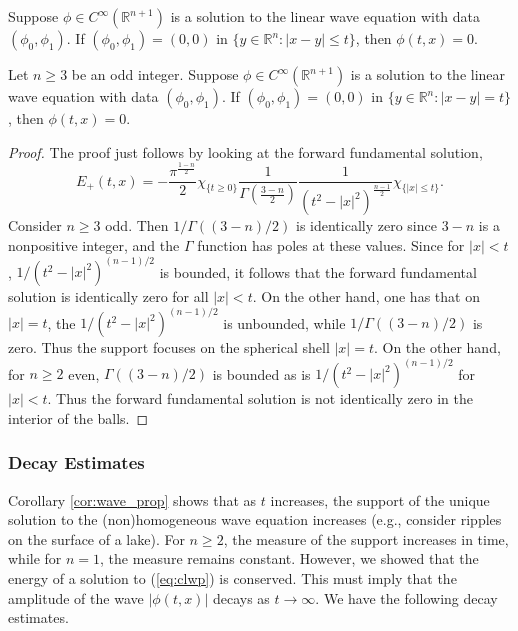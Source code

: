 \documentclass{article}
\begin{document}
\begin{corollary}
	Suppose $\phi  \in C^{\infty}(\mathbb{R}^{n + 1})$ is a solution to the linear wave equation with data $(\phi_{0}, \phi_{1})$. If $(\phi_{0}, \phi_{1}) = (0,0)$ in $\{y \in \mathbb{R}^{n}: |x - y| \leq t\}$, then $\phi(t, x) = 0$. 
\end{corollary}

\begin{corollary}
	Let $n \geq 3$ be an odd integer. Suppose $\phi \in C^{\infty}(\mathbb{R}^{n + 1})$ is a solution to the linear wave equation with data $(\phi_{0}, \phi_{1})$. If $(\phi_{0}, \phi_{1}) = (0,0)$ in $\{y \in \mathbb{R}^{n}: |x - y| = t\}$, then $\phi(t, x) =0$. 
\end{corollary} 
\begin{proof}
	The proof just follows by looking at the forward fundamental solution, 
	\begin{equation*}
		E_{+}(t, x) = -\frac{\pi^{\frac{1-n}{2}}}{2}\chi_{\{t \geq 0\}}\frac{1}{\Gamma(\frac{3 - n}{2})}\frac{1}{(t^{2} - |x|^{2})^{\frac{n- 1}{2}}}\chi_{\{|x| \leq t\}}. 
	\end{equation*} 
	Consider $n \geq 3$ odd. Then $1/\Gamma((3 -n)/2)$ is identically zero since $3 - n$ is a nonpositive integer, and the $\Gamma$ function has poles at these values. Since for $|x| < t$, $1/(t^{2} - |x|^{2})^{(n - 1)/2}$ is bounded, it follows that the forward fundamental solution is identically zero for all $|x| < t$. On the other hand, one has that on $|x| = t$, the $1/(t^{2} - |x|^{2})^{(n - 1)/2}$ is unbounded, while $1/\Gamma((3 - n)/2)$ is zero. Thus the support focuses on the spherical shell $|x| = t$. On the other hand, for $n \geq 2$ even, $\Gamma((3 - n)/2)$ is bounded as is $1/(t^{2} - |x|^{2})^{(n - 1)/2}$ for $|x| < t$. Thus the forward fundamental solution is not identically zero in the interior of the balls. 
\end{proof}

\subsubsection{Decay Estimates}

Corollary \ref{cor:wave_prop} shows that as $t$ increases, the support of the unique solution to the (non)homogeneous wave equation increases (e.g., consider ripples on the surface of a lake). For $n \geq 2$, the measure of the support increases in time, while for $n =1$, the measure remains constant. However, we showed that the energy of a solution to (\ref{eq:clwp}) is conserved. This must imply that the amplitude of the wave $|\phi(t, x)|$ decays as $t \to \infty$. We have the following decay estimates. 
\end{document}

